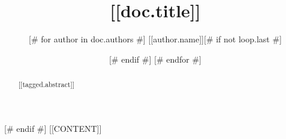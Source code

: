 \documentclass{article}
\title{[[doc.title]]}
\author{[# for author in doc.authors #]
[[author.name]][# if not loop.last #] \and [# endif #]
[# endfor #]
}
\date{\displaydate{articleDate}}
\begin{document}
\begin{abstract}[[tagged.abstract]]\end{abstract}[# endif #]
[[CONTENT]]

\end{document}
